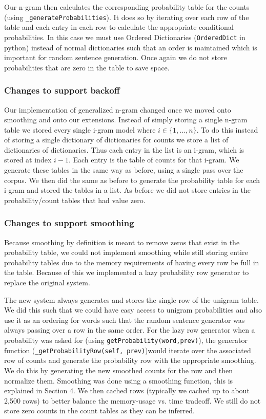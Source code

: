 \documentclass{article}
\begin{document}
Our n-gram then calculates the corresponding probability table for the counts (using \texttt{\_generateProbabilities}). It does so by iterating over each row of the table and each entry in each row to calculate the appropriate conditional probabilities. In this case we must use Ordered Dictionaries (\texttt{OrderedDict} in python) instead of normal dictionaries such that an order is maintained which is important for random sentence generation. Once again we do not store probabilities that are zero in the table to save space. 

\subsubsection{Changes to support backoff}
Our implementation of generalized n-gram changed once we moved onto smoothing and onto our extensions. Instead of simply storing a single n-gram table we stored every single i-gram model where $i\in \lbrace 1,...,n \rbrace$. To do this instead of storing a single dictionary of dictionaries for counts we store a list of dictionaries of dictionaries. Thus each entry in the list is an i-gram, which is stored at index $i-1$. Each entry is the table of counts for that i-gram. We generate these tables in the same way as before, using a single pass over the corpus. We then did the same as before to generate the probability table for each i-gram and stored the tables in a list. As before we did not store entries in the probability/count tables that had value zero.

\subsubsection{Changes to support smoothing}
Because smoothing by definition is meant to remove zeros that exist in the probability table, we could not implement smoothing while still storing entire probability tables due to the memory requirements of having every row be full in the table. Because of this we implemented a lazy probability row generator to replace the original system.

The new system always generates and stores the single row of the unigram table. We did this such that we could have easy access to unigram probabilities and also use it as an ordering for words such that the random sentence generator was always passing over a row in the same order. For the lazy row generator when a probability was asked for (using \texttt{getProbability(word,prev)}), the generator function (\texttt{\_getProbabilityRow(self, prev)})would iterate over the associated row of counts and generate the probability row with the appropriate smoothing. We do this by generating the new smoothed counts for the row and then normalize them. Smoothing was done using a smoothing function, this is explained in Section 4. We then cached rows (typically we cached up to about 2,500 rows) to better balance the memory-usage vs. time tradeoff. We still do not store zero counts in the count tables as they can be inferred.
\end{document}
